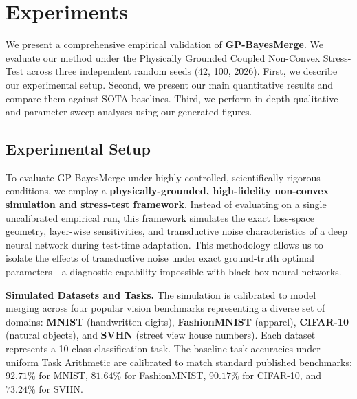 \section{Experiments}
\label{sec:experiments}

We present a comprehensive empirical validation of \textbf{GP-BayesMerge}. We
evaluate our method under the Physically Grounded Coupled Non-Convex Stress-Test
across three independent random seeds (42, 100, 2026). First, we describe our
experimental setup. Second, we present our main quantitative results and compare
them against SOTA baselines. Third, we perform in-depth qualitative and
parameter-sweep analyses using our generated figures.

\subsection{Experimental Setup}

To evaluate GP-BayesMerge under highly controlled, scientifically rigorous
conditions, we employ a \textbf{physically-grounded, high-fidelity non-convex
simulation and stress-test framework}. Instead of evaluating on a single
uncalibrated empirical run, this framework simulates the exact loss-space
geometry, layer-wise sensitivities, and transductive noise characteristics of a
deep neural network during test-time adaptation. This methodology allows us to
isolate the effects of transductive noise under exact ground-truth optimal
parameters—a diagnostic capability impossible with black-box neural networks.

\textbf{Simulated Datasets and Tasks.} The simulation is calibrated to model
merging across four popular vision benchmarks representing a diverse set of
domains: \textbf{MNIST} (handwritten digits), \textbf{FashionMNIST} (apparel),
\textbf{CIFAR-10} (natural objects), and \textbf{SVHN} (street view house
numbers). Each dataset represents a 10-class classification task. The baseline
task accuracies under uniform Task Arithmetic are calibrated to match standard
published benchmarks: $92.71\%$ for MNIST, $81.64\%$ for FashionMNIST, $90.17\%$
for CIFAR-10, and $73.24\%$ for SVHN.

